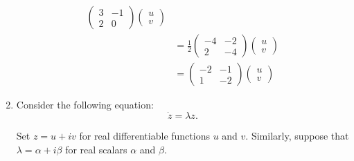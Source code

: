\documentclass[12pt,letterpaper]{article}
\begin{document}
\begin{enumerate}[label=(\alph*)]
\begin{align}
		      \begin{pmatrix}
			      3 & -1 \\
			      2 & 0
		      \end{pmatrix}\begin{pmatrix}
			      u \\
			      v
		      \end{pmatrix}\\
		                                 & =
		      \frac{1}{2}\begin{pmatrix}
			      -4 & -2 \\
			      2  & -4
		      \end{pmatrix}\begin{pmatrix}
			      u \\
			      v
		      \end{pmatrix}\\
		                                 & =
		      \begin{pmatrix}
			      -2 & -1 \\
			      1  & -2
		      \end{pmatrix}\begin{pmatrix}
			      u \\
			      v
		      \end{pmatrix} \label{eq:orthog_1}
	      \end{align}
	\item Consider the following equation:
	      \begin{equation}
		      \dot{z} = \lambda z \label{eq:complex_1}.
	      \end{equation}

	      Set $z = u + i v$ for real differentiable functions $u$ and $v$.
	      Similarly, suppose that $\lambda = \alpha + i \beta$ for real scalars $\alpha$ and $\beta$.


\end{enumerate}
\end{document}
